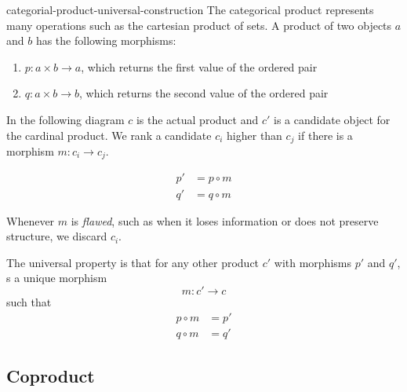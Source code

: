 \documentclass[preview]{standalone}
\begin{document}
\begin{snippet}{categorial-product-universal-construction}
The categorical product represents many operations
such as the cartesian product of sets.
A product of two objects \(a\) and \(b\) has the following
morphisms:
\begin{enumerate}
    \item \(p:a\times b \to a\), which returns the first value of the ordered pair
    \item \(q:a\times b \to b\), which returns the second value of the ordered pair
\end{enumerate}

In the following diagram \(c\) is the actual product and \(c'\) is a candidate object
for the cardinal product.
We rank a candidate \(c_i\) higher than \(c_j\) if there is a morphism
\(m:c_i \to c_j\).

\begin{minipage}{0.5\textwidth}
\end{minipage}
\begin{minipage}{0.5\textwidth}
    \begin{align*}
        p' &= p \circ m \\
        q' &= q \circ m 
    \end{align*}
\end{minipage}

Whenever \(m\) is \textit{flawed}, such as when it loses information
or does not preserve structure, we discard \(c_i\).

The universal property is that for any other product
\(c'\) with morphisms \(p'\) and \(q'\),
s a unique morphism
\[
    m:c'\to c
\]
such that
\begin{align*}
    p \circ m &= p' \\
    q \circ m &= q'
\end{align*}
\end{snippet}

\subsection{Coproduct}
\end{document}
